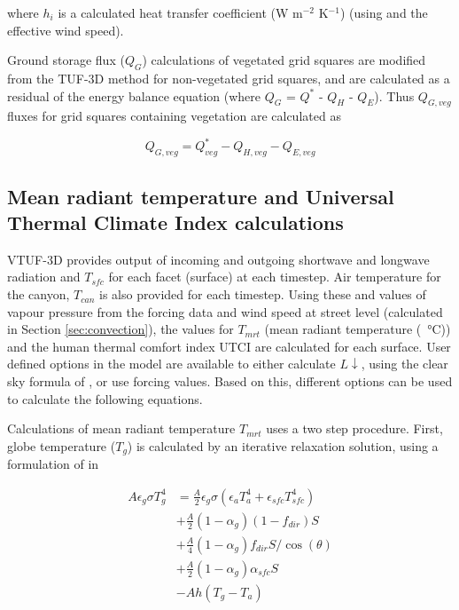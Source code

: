 \documentclass[final,3p,times,authoryear]{elsarticle}
\begin{document}
where $h_{i}$ is a calculated heat transfer coefficient (W m$^{-2}$ K$^{-1}$) (using \cite{Mascart1995} and the effective wind speed). 


Ground storage flux ($Q_{G}$) calculations of vegetated grid squares are modified from the TUF-3D method for non-vegetated grid squares, and are calculated as a residual of the energy balance equation (where $Q_{G}$ = $Q^{*}$ - $Q_{H}$ - $Q_{E}$). Thus $Q_{G,veg}$ fluxes for grid squares containing vegetation are calculated as

\begin{equation}\label{eq:qgvtuf}
 Q_{G,veg} =  Q^{*}_{veg} - Q_{H,veg} - Q_{E,veg}
\end{equation}


\subsection{Mean radiant temperature and Universal Thermal Climate Index calculations}\label{sec:tmrtutci}

VTUF-3D provides output of incoming and outgoing shortwave and longwave radiation and $T_{sfc}$ for each facet (surface) at each timestep. Air temperature for the canyon, $T_{can}$ is also provided for each timestep. Using these and values of vapour pressure from the forcing data and wind speed at street level (calculated in Section \ref{sec:convection}), the values for $T_{mrt}$ (mean radiant temperature (\SI{}{\degreeCelsius})) and the human thermal comfort index UTCI are calculated for each surface. User defined options in the model are available to either calculate $L\downarrow$, using the clear sky formula of \cite{Prata1996}, or use forcing values. Based on this, different options can be used to calculate the following equations.


Calculations of mean radiant temperature $T_{mrt}$ uses a two step procedure. First, globe temperature ($T_{g}$) is calculated by an iterative relaxation solution, using a formulation of \cite{Liljegren2008} in  

\begin{equation}\label{eq:tg2}
\begin{split}
A\epsilon_{g}\sigma T_{g}^{4} &= \frac{A}{2} \epsilon_{g}\sigma( \epsilon_{a} T_{a}^{4} +  \epsilon_{sfc} T_{sfc}^{4} ) \\
&+ \frac{A}{2}( 1-\alpha_{g})(1-f_{dir})S  \\
&+ \frac{A}{4}( 1-\alpha_{g})f_{dir}S /\cos(\theta) \\
&+ \frac{A}{2}( 1-\alpha_{g})\alpha_{sfc}S \\
&- Ah(T_{g}-T_{a})   
\end{split}
\end{equation}
\end{document}
